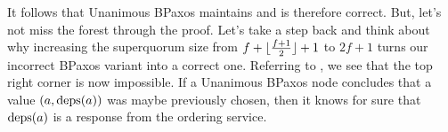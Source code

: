 It follows that Unanimous BPaxos maintains  and is
therefore correct. But, let's not miss the forest through the proof. Let's take
a step back and think about why increasing the superquorum size from $f +
\lfloor\frac{f+1}{2}\rfloor + 1$ to $2f+1$ turns our incorrect BPaxos variant into a
correct one. Referring to , we see that the top right
corner is now impossible. If a Unanimous BPaxos node concludes that a value
$(a, \text{deps}(a))$ was maybe previously chosen, then it knows for sure that
$\text{deps}(a)$ is a response from the ordering service.

